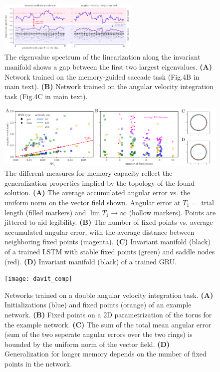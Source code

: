 \documentclass[letterpaper]{article}
\begin{document}
\begin{figure}[tbhp]
  \centering
  \includegraphics[width=0.6\textwidth]{eigenvalue_gap_comp}
  \caption{The eigenvalue spectrum of the linearization along the invariant manifold shows a gap between the first two largest eigenvalues.
    \textbf{(A)} Network trained on the memory-guided saccade task (Fig.4B in main text).
    \textbf{(B)} Network trained on the angular velocity integration task (Fig.4C in main text).
}\label{fig:eigenvalue_gap}
\end{figure}




\begin{figure}[tbhp]
  \centering
  \includegraphics[width=.9\textwidth]{angular_losses_lstm_gru}
  \caption{The different measures for memory capacity reflect the generalization properties implied by the topology of the found solution.
    \textbf{(A)} The average accumulated angular error vs. the uniform norm on the vector field shown.
     Angular error at \(T_1 =\) trial length (filled markers) and \(\lim T_{1} \to \infty\)  (hollow markers).
      Points are jittered to aid legibility.
    \textbf{(B)} The number of fixed points vs. average accumulated angular error, with the average distance between neighboring fixed points (magenta).
    \textbf{(C)} Invariant manifold (black) of a trained LSTM with stable fixed points (green) and saddle nodes (red).
    \textbf{(D)} Invariant manifold (black) of a trained GRU.
}\label{fig:angular_losses_lstm_gru}
\end{figure}



\begin{figure}[tbhp]
  \centering
  \texttt{[image: davit\_comp]}
  \caption{Networks trained on a double angular velocity integration task.
    \textbf{(A)} Initializations (blue) and fixed points (orange) of an example network.
    \textbf{(B)} Fixed points on a 2D parametrization of the torus for the example network.
    \textbf{(C)} The sum of the total mean angular error (sum of the two seperate angular errors over the two rings) is bounded by the uniform norm of the vector field.
    \textbf{(D)} Generalization for longer memory depends on the number of fixed points in the network.
}\label{fig:davit}
\end{figure}
\end{document}
